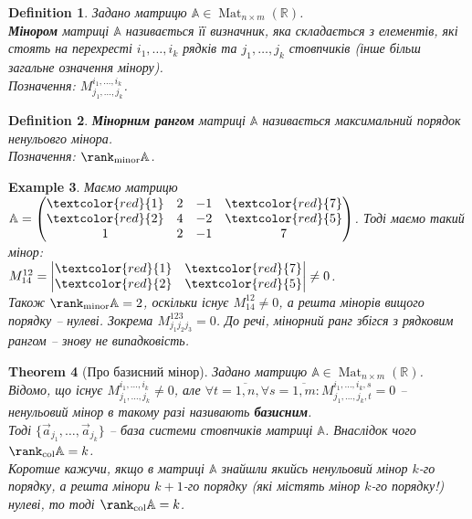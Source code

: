 \documentclass[a4paper, 10pt]{article}
\theoremstyle{theoremdd}
\newtheorem{theorem}{Theorem}[subsection]
\newtheorem{definition}[theorem]{Definition}
\newtheorem{example}[theorem]{Example}
\DeclareMathOperator{\Mat}{Mat}
\begin{document}
\begin{definition}
Задано матрицю $\mathbb{A} \in \Mat_{n \times m}(\mathbb{R})$.\\
\textbf{Мінором} матриці $\mathbb{A}$ називається її визначник, яка складається з елементів, які стоять на перехресті $i_1,\dots,i_k$ рядків та $j_1,\dots,j_k$ стовпчиків (інше більш загальне означення мінору).\\
Позначення: $M_{j_1,\dots,j_k}^{i_1,\dots,i_k}$.
\end{definition}

\begin{definition}
\textbf{Мінорним рангом} матриці $\mathbb{A}$ називається максимальний порядок ненульовго мінора.\\
Позначення: $\rank_{\textrm{minor}} \mathbb{A}$.
\end{definition}

\begin{example}
Маємо матрицю $\mathbb{A} = \begin{pmatrix}
\textcolor{red}{1} & 2 & -1 & \textcolor{red}{7} \\
\textcolor{red}{2} & 4 & -2 & \textcolor{red}{5} \\
1 & 2 & -1 & 7
\end{pmatrix}$. Тоді маємо такий мінор:\\
$M_{14}^{12} = \begin{vmatrix}
\textcolor{red}{1} & \textcolor{red}{7} \\
\textcolor{red}{2} & \textcolor{red}{5}
\end{vmatrix} \neq 0$.\\
Також $\rank_{\text{minor}} \mathbb{A} = 2$, оскільки існує $M_{14}^{12} \neq 0$, а решта мінорів вищого порядку -- нулеві. Зокрема $M^{123}_{j_1j_2j_3} = 0$. До речі, мінорний ранг збігся з рядковим рангом -- знову не випадковість.
\end{example}

\begin{theorem}[Про базисний мінор]
Задано матрицю $\mathbb{A} \in \Mat_{n \times m}(\mathbb{R})$. Відомо, що існує $M_{j_1,\dots,j_k}^{i_1,\dots,i_k} \neq 0$, але $\forall t = \overline{1,n}, \forall s = \overline{1,m}: M_{j_1,\dots,j_k,t}^{i_1,\dots,i_k,s} = 0$ -- ненульовий мінор в такому разі називають \textbf{базисним}. \\
Тоді $\{\vec{a}_{j_1},\dots,\vec{a}_{j_k}\}$ -- база системи стовпчиків матриці $\mathbb{A}$. Внаслідок чого $\rank_{\text{col}} \mathbb{A} = k$.
\bigskip \\
Коротше кажучи, якщо в матриці $\mathbb{A}$ знайшли якийсь ненульовий мінор $k$-го порядку, а решта мінори $k+1$-го порядку (які містять мінор $k$-го порядку!) нулеві, то тоді $\rank_{\text{col}}\mathbb{A} = k$.
\end{theorem}
\end{document}
